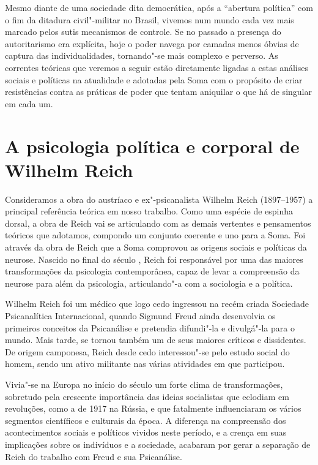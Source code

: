 Mesmo diante de uma sociedade dita democrática, após a ``abertura
política'' com o fim da ditadura civil"-militar no Brasil, vivemos num
mundo cada vez mais marcado pelos sutis mecanismos de controle. Se no
passado a presença do autoritarismo era explícita, hoje o poder navega
por camadas menos óbvias de captura das individualidades, tornando"-se
mais complexo e perverso. As correntes teóricas que veremos a seguir
estão diretamente ligadas a estas análises sociais e políticas na
atualidade e adotadas pela Soma com o propósito de criar resistências
contra as práticas de poder que tentam aniquilar o que há de singular em
cada um.

\section{A psicologia política e corporal de Wilhelm Reich}

Consideramos a obra do austríaco e ex"-psicanalista Wilhelm Reich
(1897--1957) a principal referência teórica em nosso trabalho. Como uma
espécie de espinha dorsal, a obra de Reich vai se articulando com as
demais vertentes e pensamentos teóricos que adotamos, compondo um
conjunto coerente e uno para a Soma. Foi através da obra de Reich que a
Soma comprovou as origens sociais e políticas da neurose. Nascido no
final do século , Reich foi responsável por uma das maiores
transformações da psicologia contemporânea, capaz de levar a compreensão
da neurose para além da psicologia, articulando"-a com a sociologia e a
política.

Wilhelm Reich foi um médico que logo cedo ingressou na recém criada
Sociedade Psicanalítica Internacional, quando Sigmund Freud ainda
desenvolvia os primeiros conceitos da Psicanálise e pretendia difundi"-la
e divulgá"-la para o mundo. Mais tarde, se tornou também um de seus
maiores críticos e dissidentes. De origem camponesa, Reich desde cedo
interessou"-se pelo estudo social do homem, sendo um ativo militante nas
várias atividades em que participou.

Vivia"-se na Europa no início do século  um forte clima de
transformações, sobretudo pela crescente importância das ideias
socialistas que eclodiam em revoluções, como a de 1917 na Rússia, e que
fatalmente influenciaram os vários segmentos científicos e culturais da
época. A diferença na compreensão dos acontecimentos sociais e políticos
vividos neste período, e a crença em suas implicações sobre os
indivíduos e a sociedade, acabaram por gerar a separação de Reich do
trabalho com Freud e sua Psicanálise.

